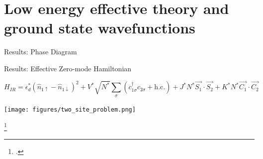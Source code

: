 \documentclass[aspectratio=169]{beamer}
\newcommand{\cen}[1]{\begin{center}{#1}\end{center}}
\begin{document}
\section{Low energy effective theory and ground state wavefunctions}
\begin{frame}[noframenumbering]{Results: Phase Diagram}
\cen{
	\def\svgwidth{0.75\columnwidth}
	
}
\end{frame}

\begin{frame}[noframenumbering]{Results: Effective Zero-mode Hamiltonian}
	\vspace*{-30pt}
\cen{
	\Large\[H_{IR} = \epsilon_d^* \left( \hat n_{1 \uparrow} - \hat n_{1 \downarrow} \right) ^2 + V^*\sqrt{N^*}\sum_{\sigma}\left(c^\dagger_{1\sigma}c_{2\sigma} + \text{h.c.} \right) + J^*N^*\vec{S_1}\cdot\vec{S_2} + K^*N^*\vec{C_1}\cdot\vec{C_2}\]
}
\hspace*{-15pt}
	\begin{minipage}{0.5\textwidth}
	{\centering
	\texttt{[image: figures/two\_site\_problem.png]}}
\end{minipage}
\hspace*{25pt}
\begin{minipage}{0.45\textwidth}{
	\centering
	\def\svgwidth{\columnwidth}
	
}

\end{minipage}

\footcite{wilson,hrk-nrg,taraphder}

\end{frame}


\end{document}
